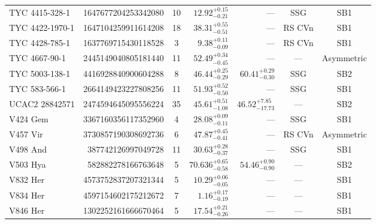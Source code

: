 \begin{table}[htbp]
\begin{minipage}{\textwidth}
\begin{tabular}{lrcrrcc}
 TYC 4415-328-1 & 1647677204253342080 & 10 & $12.92^{+0.15}_{-0.21}$ & --- & SSG & SB1 \\
 TYC 4422-1970-1 & 1647104259911614208 & 18 & $38.31^{+0.55}_{-0.51}$ & --- & RS CVn & SB1 \\
 TYC 4428-785-1 & 1637769715430118528 & 3 & $9.38^{+0.11}_{-0.09}$ & --- & RS CVn & SB1 \\
 TYC 4667-90-1 & 2445149040805181440 & 11 & $52.49^{+0.34}_{-0.45}$ & --- & --- & Asymmetric \\
 TYC 5003-138-1 & 4416928840900604288 & 8 & $46.44^{+0.25}_{-0.29}$ & $60.41^{+0.29}_{-0.30}$ & SSG & SB2 \\
 TYC 583-566-1 & 2664149423227808256 & 11 & $51.93^{+0.52}_{-0.50}$ & --- & SSG & SB1 \\
 UCAC2 28842571 & 2474594645095556224 & 35 & $45.61^{+0.51}_{-1.08}$ & $46.52^{+7.85}_{-17.73}$ & --- & SB2 \\
 V424 Gem & 3367160356117352960 & 4 & $28.08^{+0.09}_{-0.11}$ & --- & SSG & SB1 \\
 V457 Vir & 3730857190308692736 & 6 & $47.87^{+0.45}_{-0.41}$ & --- & RS CVn & Asymmetric \\
 V498 And & 387742126997049728 & 11 & $30.63^{+0.28}_{-0.37}$ & --- & SSG & SB1 \\
 V503 Hya & 582882278166763648  & 5 & $70.636^{+0.65}_{-0.58}$ & $54.46^{+0.90}_{-0.90}$ & --- & SB2 \\
 V832 Her & 4573752837207321344 & 5 & $10.29^{+0.06}_{-0.05}$ & --- & --- & SB1 \\
 V834 Her & 4597154602175212672 & 7 & $1.16^{+0.17}_{-0.19}$ & --- & --- & SB1 \\
 V846 Her & 1302252161666670464 & 5 & $17.54^{+0.21}_{-0.26}$ & --- & --- & SB1 \\
\hline
\end{tabular}

\end{minipage}
\end{table}